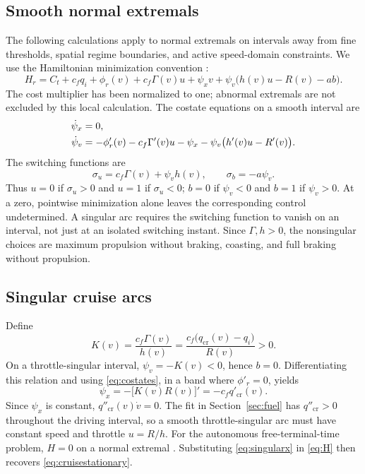 \documentclass[10pt,a4paper]{article}
\newcommand{\cruise}{\mathrm{cr}}
\begin{document}
\subsection{Smooth normal extremals}
The following calculations apply to normal extremals on intervals away from fine thresholds, spatial regime boundaries, and active speed-domain constraints. We use the Hamiltonian minimization convention \cite{liberzon}:
\begin{equation}
H_r=C_t+c_fq_i+\phi_r(v)+c_f\Gamma(v)u
       +\psi_xv+\psi_v\bigl(h(v)u-R(v)-ab\bigr).
\label{eq:H}
\end{equation}
The cost multiplier has been normalized to one; abnormal extremals are not excluded by this local calculation. The costate equations on a smooth interval are
\begin{align}
\dot\psi_x&=0,\notag\\
\dot\psi_v&=-\phi'_r(v)-c_f\Gamma'(v)u-\psi_x
             -\psi_v\bigl(h'(v)u-R'(v)\bigr).
\label{eq:costates}
\end{align}
The switching functions are
\begin{equation}
\sigma_u=c_f\Gamma(v)+\psi_vh(v),\qquad \sigma_b=-a\psi_v.
\end{equation}
Thus $u=0$ if $\sigma_u>0$ and $u=1$ if $\sigma_u<0$; $b=0$ if $\psi_v<0$ and $b=1$ if $\psi_v>0$. At a zero, pointwise minimization alone leaves the corresponding control undetermined. A singular arc requires the switching function to vanish on an interval, not just at an isolated switching instant. Since $\Gamma,h>0$, the nonsingular choices are maximum propulsion without braking, coasting, and full braking without propulsion.

\subsection{Singular cruise arcs}
Define
\begin{equation}
K(v)=\frac{c_f\Gamma(v)}{h(v)}
     =\frac{c_f\bigl(q_{\cruise}(v)-q_i\bigr)}{R(v)}>0.
\label{eq:K}
\end{equation}
On a throttle-singular interval, $\psi_v=-K(v)<0$, hence $b=0$. Differentiating this relation and using \eqref{eq:costates}, in a band where $\phi'_r=0$, yields
\begin{equation}
\psi_x=-\bigl[K(v)R(v)\bigr]'=-c_fq'_{\cruise}(v).
\label{eq:singularx}
\end{equation}
Since $\psi_x$ is constant, $q''_{\cruise}(v)\dot v=0$. The fit in Section~\ref{sec:fuel} has $q''_{\cruise}>0$ throughout the driving interval, so a smooth throttle-singular arc must have constant speed and throttle $u=R/h$. For the autonomous free-terminal-time problem, $H=0$ on a normal extremal \cite{liberzon}. Substituting \eqref{eq:singularx} in \eqref{eq:H} then recovers \eqref{eq:cruisestationary}.
\end{document}

